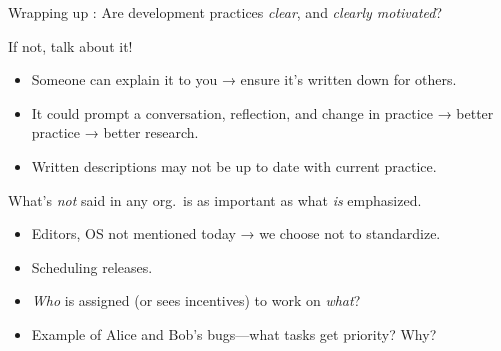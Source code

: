 \documentclass[12pt,aspectratio=169]{beamer}
\begin{document}
\begin{frame}{Wrapping up}
: Are development practices \emph{clear}, and \emph{clearly motivated}?

If not, talk about it!
\begin{itemize}
  \item Someone can explain it to you → ensure it's written down for others.
  \item It could prompt a conversation, reflection, and change in practice → better practice → better research.
  \item Written descriptions may not be up to date with current practice.
\end{itemize}

\bigskip
{}
What's \emph{not} said in any org.\ is as important as what \emph{is} emphasized.

\begin{itemize}
  \item Editors, OS not mentioned today → we choose not to standardize.
  \item Scheduling releases.
  \item \emph{Who} is assigned (or sees incentives) to work on \emph{what}?
  \item Example of Alice and Bob's bugs—what tasks get priority? Why?
\end{itemize}

\end{frame}

\begin{frame}[plain]

\centering \Huge {}

\end{frame}
\end{document}
